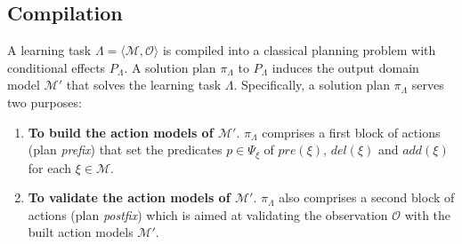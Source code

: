 \documentclass[runningheads]{llncs}
\newcommand{\tup}[1]{{\langle #1 \rangle}}
\begin{document}
\subsection{Compilation}
A learning task $\Lambda=\tup{\mathcal{M},{\mathcal O}}$ is compiled into a classical planning problem with conditional effects $P_{\Lambda}$. A solution plan $\pi_\Lambda$ to $P_{\Lambda}$ induces the output domain model $\mathcal{M}'$ that solves the learning task $\Lambda$. Specifically, a solution plan $\pi_\Lambda$ serves two purposes:

\begin{enumerate}
\item {\bf To build the action models of $\mathcal{M}'$}. $\pi_\Lambda$ comprises a first block of actions (plan {\em prefix}) that set the predicates $p\in \Psi_{\xi}$ of $pre(\xi)$, $del(\xi)$ and $add(\xi)$ for each $\xi\in\mathcal{M}$.
\item {\bf To validate the action models of $\mathcal{M}'$}. $\pi_\Lambda$ also comprises a second block of actions (plan {\em postfix}) which is aimed at validating the observation ${\mathcal O}$ with the built action models $\mathcal{M}'$.
\end{enumerate}
\end{document}
